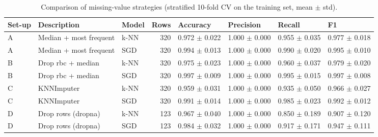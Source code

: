 \begin{table}
\caption{Comparison of missing-value strategies (stratified 10-fold CV on the training set, mean $\pm$ std).}
\label{tab:missing_values}
\begin{tabular}{lllrllll}
\toprule
Set-up & Description & Model & Rows & Accuracy & Precision & Recall & F1 \\
\midrule
A & Median + most frequent & k-NN & 320 & 0.972 $\pm$ 0.022 & 1.000 $\pm$ 0.000 & 0.955 $\pm$ 0.035 & 0.977 $\pm$ 0.018 \\
A & Median + most frequent & SGD & 320 & 0.994 $\pm$ 0.013 & 1.000 $\pm$ 0.000 & 0.990 $\pm$ 0.020 & 0.995 $\pm$ 0.010 \\
B & Drop rbc + median & k-NN & 320 & 0.975 $\pm$ 0.023 & 1.000 $\pm$ 0.000 & 0.960 $\pm$ 0.037 & 0.979 $\pm$ 0.020 \\
B & Drop rbc + median & SGD & 320 & 0.997 $\pm$ 0.009 & 1.000 $\pm$ 0.000 & 0.995 $\pm$ 0.015 & 0.997 $\pm$ 0.008 \\
C & KNNImputer & k-NN & 320 & 0.959 $\pm$ 0.031 & 1.000 $\pm$ 0.000 & 0.935 $\pm$ 0.050 & 0.966 $\pm$ 0.027 \\
C & KNNImputer & SGD & 320 & 0.991 $\pm$ 0.014 & 1.000 $\pm$ 0.000 & 0.985 $\pm$ 0.023 & 0.992 $\pm$ 0.012 \\
D & Drop rows (dropna) & k-NN & 123 & 0.967 $\pm$ 0.040 & 1.000 $\pm$ 0.000 & 0.850 $\pm$ 0.189 & 0.907 $\pm$ 0.120 \\
D & Drop rows (dropna) & SGD & 123 & 0.984 $\pm$ 0.032 & 1.000 $\pm$ 0.000 & 0.917 $\pm$ 0.171 & 0.947 $\pm$ 0.111 \\
\bottomrule
\end{tabular}
\end{table}
